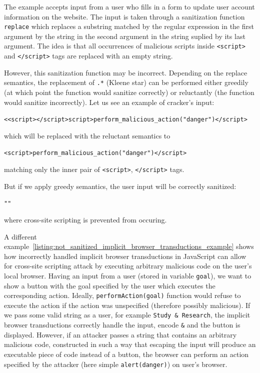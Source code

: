 The example accepts input from a user who fills in a form to update user account information on the website.
The input is taken through a sanitization function \texttt{replace} which replaces a substring matched by the regular expression in the first argument by the string in the second argument in the string suplied by its last argument.
The idea is that all occurrences of malicious scripts inside \texttt{<script>} and \texttt{</script>} tags are replaced with an empty string.

However, this sanitization function may be incorrect.
Depending on the replace semantics, the replacement of \texttt{.*} (Kleene star) can be performed either greedily (at which point the function would sanitize correctly) or reluctantly (the function would sanitize incorrectly).
Let us see an example of cracker's input:
\begin{center}
 \texttt{<<script></script>script>perform\_malicious\_action("danger")</script>}
\end{center}
which will be replaced with the reluctant semantics to
\begin{center}
 \texttt{<script>perform\_malicious\_action("danger")</script>}
\end{center}

matching only the inner pair of \texttt{<script>}, \texttt{</script>} tags.

But if we apply greedy semantics, the user input will be correctly sanitized:
\begin{center}
 \texttt{""}
\end{center}
where cross-site scripting is prevented from occuring.

A different example~\ref{listing:not_sanitized_implicit_browser_transductions_example} shows how incorrectly handled implicit browser transductions in JavaScript can allow for cross-site scripting attack by executing arbitrary malicious code on the user's local browser.
Having an input from a user (stored in variable \texttt{goal}), we want to show a button with the goal specified by the user which executes the corresponding action. Ideally, \texttt{performAction(goal)} function would refuse to execute the action if the action was unspecified (therefore possibly malicious).
If we pass some valid string as a user, for example \texttt{Study \& Research}, the implicit browser transductions correctly handle the input, encode \texttt{\&} and the button is displayed.
However, if an attacker passes a string that contains an arbitrary malicious code, constructed in such a way that escaping the input will produce an executable piece of code instead of a button, the browser can perform an action specified by the attacker (here simple \texttt{alert(danger)}) on user's browser.

